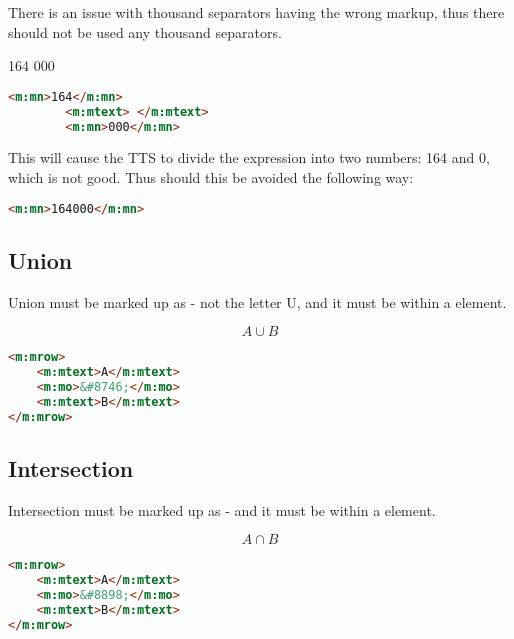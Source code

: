 \documentclass[english,a4paper,11pt]{article}
\begin{document}
There is an issue with thousand separators having the wrong markup, thus there should not be used any thousand separators.

\begin{examples}
	\textsc{164 000}
	\begin{lstlisting}[language=HTML, caption={\textbf{Invalid markup}}]
		<m:mn>164</m:mn>
		<m:mtext> </m:mtext>
		<m:mn>000</m:mn> 
	\end{lstlisting}
	
	This will cause the TTS to divide the expression into two numbers: 164 and 0, which is not good. Thus should this be avoided the following way:
	\begin{lstlisting}[language=HTML, caption={Valid markup}]
		<m:mn>164000</m:mn>
	\end{lstlisting}
\end{examples}

\subsection{Union}

Union must be marked up as  - not the letter U, and it must be within a  element. 

\begin{examples}
\begin{equation}
	A \cup B
\end{equation}
\begin{lstlisting}[language=HTML]
<m:mrow>
	<m:mtext>A</m:mtext>
	<m:mo>&#8746;</m:mo>
	<m:mtext>B</m:mtext>
</m:mrow>
\end{lstlisting}
\end{examples}

\subsection{Intersection}

Intersection must be marked up as  - and it must be within a  element. 

\begin{examples}
\begin{equation}
	A \cap B
\end{equation}
\begin{lstlisting}[language=HTML]
<m:mrow>
	<m:mtext>A</m:mtext>
	<m:mo>&#8898;</m:mo>
	<m:mtext>B</m:mtext>
</m:mrow>
\end{lstlisting}
\end{examples}
\end{document}
